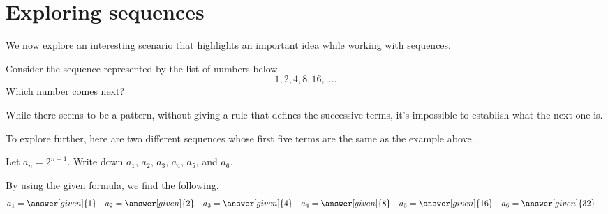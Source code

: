 \documentclass{ximera}
\begin{document}
\section{Exploring sequences}
We now explore an interesting scenario that highlights an important idea while working with sequences.

\begin{question}
  Consider the sequence represented by the list of numbers below.
  \[
  1, 2, 4, 8, 16, \dots.
  \]
Which number comes next? 

While there seems to be a pattern, without giving a rule that defines the successive terms, it's impossible to establish what the next one is. 

\end{question}

To explore further, here are two different sequences whose first five terms are the same as the example above.

\begin{example}
  Let $a_n = 2^{n-1}$.  Write down $a_1$, $a_2$, $a_3$, $a_4$, $a_5$, and
  $a_6$.
  \begin{explanation}
    By using the given formula, we find the following.
    \begin{align*}
      a_1 &= \answer[given]{1} & a_2 &= \answer[given]{2} & 
      a_3 &= \answer[given]{4} & 
      a_4 &= \answer[given]{8} & 
      a_5 &= \answer[given]{16} & 
      a_6 &= \answer[given]{32}
    \end{align*}
  \end{explanation}
\end{example}
\end{document}
